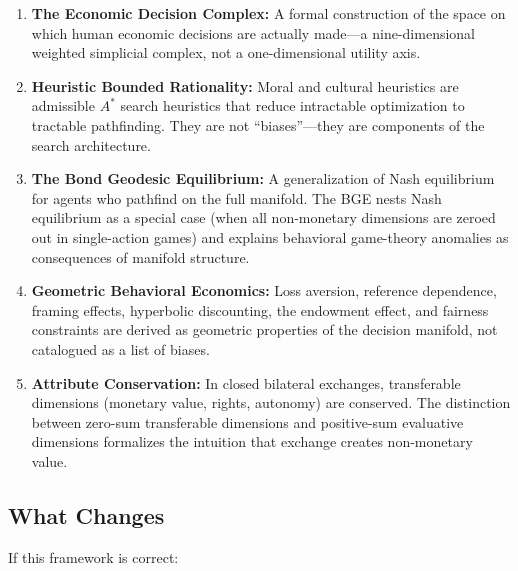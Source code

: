\documentclass[12pt]{article}
\theoremstyle{definition}
\theoremstyle{remark}
\begin{document}
\begin{enumerate}
    \item \textbf{The Economic Decision Complex:} A formal construction of the space on which human economic decisions are actually made---a nine-dimensional weighted simplicial complex, not a one-dimensional utility axis.

    \item \textbf{Heuristic Bounded Rationality:} Moral and cultural heuristics are admissible $A^*$ search heuristics that reduce intractable optimization to tractable pathfinding.  They are not ``biases''---they are components of the search architecture.

    \item \textbf{The Bond Geodesic Equilibrium:} A generalization of Nash equilibrium for agents who pathfind on the full manifold.  The BGE nests Nash equilibrium as a special case (when all non-monetary dimensions are zeroed out in single-action games) and explains behavioral game-theory anomalies as consequences of manifold structure.

    \item \textbf{Geometric Behavioral Economics:} Loss aversion, reference dependence, framing effects, hyperbolic discounting, the endowment effect, and fairness constraints are derived as geometric properties of the decision manifold, not catalogued as a list of biases.

    \item \textbf{Attribute Conservation:} In closed bilateral exchanges, transferable dimensions (monetary value, rights, autonomy) are conserved.  The distinction between zero-sum transferable dimensions and positive-sum evaluative dimensions formalizes the intuition that exchange creates non-monetary value.
\end{enumerate}

\subsection{What Changes}

If this framework is correct:
\end{document}
